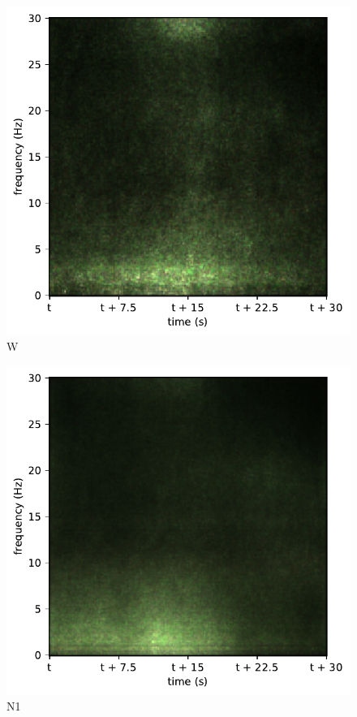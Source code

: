 \begin{subfigure}{.16\textwidth}
  \centering
  \includegraphics[width=1\linewidth]{./../Article/pics/class_rnn_0}
  \caption{W}
  \label{fig_1_31}
\end{subfigure}%
\begin{subfigure}{.16\textwidth}
  \centering
  \includegraphics[width=1\linewidth]{./../Article/pics/class_rnn_1}
  \caption{N1}
  \label{fig_1_32}
\end{subfigure}%
